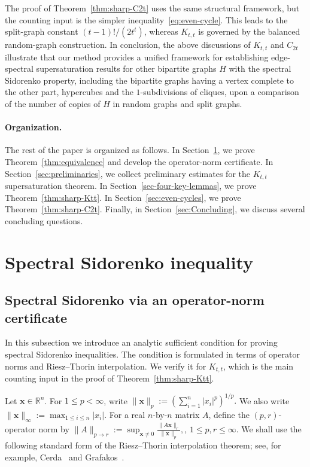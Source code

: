 \documentclass[11pt]{article}
\theoremstyle{definition}
\theoremstyle{plain}
\begin{document}
The proof of Theorem~\ref{thm:sharp-C2t} uses the same structural
framework, but the counting input is the simpler inequality~\eqref{eq:even-cycle}.
This leads to the split-graph constant \((t-1)!/(2t^t)\), whereas
\(K_{t,t}\) is governed by the balanced random-graph construction. In conclusion, the above discussions of $K_{t,t}$ and $C_{2t}$ illustrate that 
our method provides a unified framework for  establishing edge-spectral supersaturation
results for other bipartite graphs $H$ with the spectral Sidorenko property, including the bipartite graphs having a vertex complete to the other part, hypercubes and the $1$-subdivisions of cliques, upon a comparison of the number of  copies of $H$ in random graphs and split graphs. 

\paragraph{Organization.}

The rest of the paper is organized as follows.  In
Section~\ref{sec:proof-spectral-Sido}, we prove
Theorem~\ref{thm:equivalence} and develop the operator-norm certificate.
In Section~\ref{sec:preliminaries}, we collect preliminary estimates for
the \(K_{t,t}\) supersaturation theorem.  In
Section~\ref{sec-four-key-lemmas}, we prove Theorem~\ref{thm:sharp-Ktt}.
In Section~\ref{sec:even-cycles}, we prove Theorem~\ref{thm:sharp-C2t}.
Finally, in Section~\ref{sec:Concluding}, we discuss several concluding
questions.


\section{Spectral Sidorenko inequality}\label{sec:proof-spectral-Sido}

\subsection{Spectral Sidorenko via an operator-norm certificate}

In this subsection we introduce an analytic sufficient condition for
proving spectral Sidorenko inequalities.  The condition is formulated in
terms of operator norms and Riesz--Thorin interpolation.
We verify it for \(K_{t,t}\), which is the main counting input in the proof of Theorem~\ref{thm:sharp-Ktt}.

Let \(\bm{x}\in\mathbb R^n\).  For \(1\le p<\infty\), write
        $\|\bm{x}\|_p
        :=
        \left(\sum_{i=1}^n |x_i|^p\right)^{1/p}.$
We also write
        $\|\bm{x}\|_\infty:=\max_{1\le i\le n}|x_i|.$ For a real
\(n\)-by-\(n\) matrix \(A\), define the \((p,r)\)-operator norm by $ \|A\|_{p\to r}
        :=
        \sup_{\bm{x}\neq 0}
        \frac{\|A\bm{x}\|_r}{\|\bm{x}\|_p},
$, $1\le p,r\le\infty$.
We shall use the following standard form of the Riesz--Thorin
interpolation theorem; see, for example,
Cerda~\cite[page~61]{Cerda2010linear} and
Grafakos~\cite[page~37]{Grafakos2014ClassicalFourierAnalysis}.
\end{document}
